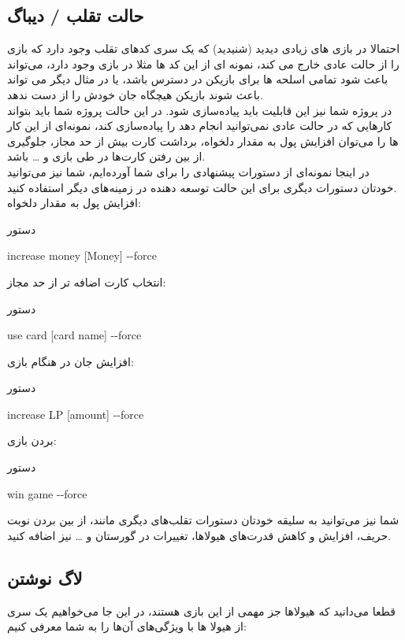 \documentclass[]{article}
\begin{document}
\subsection*{{\titr حالت تقلب / دیباگ}}
احتمالا در بازی های زیادی دیدید (شنیدید) که یک سری کدهای تقلب وجود دارد که 
بازی را از حالت عادی خارج می کند، نمونه ای از این کد ها مثلا در بازی 
وجود دارد، می‌تواند باعث شود تمامی اسلحه ها برای بازیکن در دسترس باشد، یا 
در 
مثال دیگر می تواند باعث شوند بازیکن هیچگاه جان خودش را از دست ندهد.
\\
در پروژه شما نیز این قابلیت باید پیاده‌سازی شود. در این حالت پروژه شما باید 
بتواند کارهایی که در حالت عادی نمی‌توانید انجام دهد را  پیاده‌سازی کند، 
نمونه‌ای از این کار ها را می‌توان افزایش پول به مقدار دلخواه، برداشت کارت 
بیش 
از حد مجاز، جلوگیری از بین رفتن کارت‌ها در طی بازی و … باشد.
\\
در اینجا نمونه‌ای از دستورات پیشنهادی را برای شما آورده‌ایم، شما نیز می‌توانید 
خودتان دستورات دیگری برای این حالت توسعه دهنده در زمینه‌های دیگر استفاده 
کنید. 
\\
افزایش پول به مقدار دلخواه:
\begin{mybox}[colback=yellow]{دستور}
	\begin{latin}	
		increase money  [Money] -{}-force
	\end{latin}
\end{mybox}
انتخاب کارت اضافه تر از حد مجاز:
\begin{mybox}[colback=yellow]{دستور}
	\begin{latin}	
		use card [card name] -{}-force
	\end{latin}
\end{mybox}
    افزایش جان در هنگام بازی:
\begin{mybox}[colback=yellow]{دستور}
	\begin{latin}	
		increase LP [amount] -{}-force
	\end{latin}
\end{mybox}
    بردن بازی:
\begin{mybox}[colback=yellow]{دستور}
	\begin{latin}	
		win game -{}-force
	\end{latin}
\end{mybox}
شما نیز می‌توانید به سلیقه خودتان دستورات تقلب‌های دیگری مانند، از بین بردن 
نوبت حریف، افزایش و کاهش قدرت‌های هیولاها، تغییرات در گورستان و … نیز اضافه 
کنید.

\subsection*{{\titr لاگ نوشتن}}
قطعا می‌دانید که هیولاها جز مهمی از این بازی هستند، در این جا می‌خواهیم یک سری 
از هیولا ها با ویژگی‌های آن‌ها را به شما معرفی کنیم:
\end{document}
